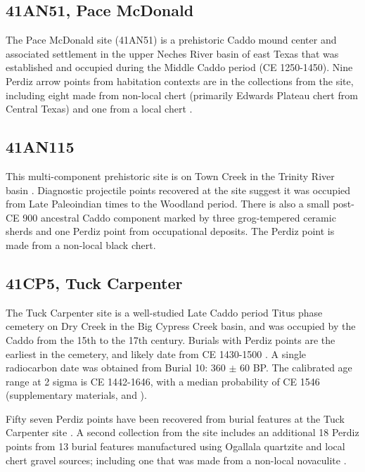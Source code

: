 \documentclass[review]{elsarticle}
\begin{document}
\subsection*{41AN51, Pace McDonald}

The Pace McDonald site (41AN51) is a prehistoric Caddo mound center and associated settlement in the upper Neches River basin of east Texas that was established and occupied during the Middle Caddo period (CE 1250-1450). Nine Perdiz arrow points from habitation contexts are in the collections from the site, including eight made from non-local chert (primarily Edwards Plateau chert from Central Texas) and one from a local chert \citep{RN2444}.

\subsection*{41AN115}

This multi-component prehistoric site is on Town Creek in the Trinity River basin \citep{RN8982}. Diagnostic projectile points recovered at the site suggest it was occupied from Late Paleoindian times to the Woodland period. There is also a small post-CE 900 ancestral Caddo component marked by three grog-tempered ceramic sherds and one Perdiz point from occupational deposits. The Perdiz point is made from a non-local black chert.

\subsection*{41CP5, Tuck Carpenter}

The Tuck Carpenter site is a well-studied Late Caddo period Titus phase cemetery on Dry Creek in the Big Cypress Creek basin, and was occupied by the Caddo from the 15th to the 17th century. Burials with Perdiz points are the earliest in the cemetery, and likely date from CE 1430-1500 \citep[197]{RN8962}. A single radiocarbon date was obtained from Burial 10: 360 $\pm$ 60 BP. The calibrated age range at 2 sigma is CE 1442-1646, with a median probability of CE 1546 (supplementary materials, and \citet{RN8980}).

Fifty seven Perdiz points have been recovered from burial features at the Tuck Carpenter site \citep{RN8963,RN3158,RN3159}. A second collection from the site includes an additional 18 Perdiz points from 13 burial features manufactured using Ogallala quartzite and local chert gravel sources; including one that was made from a non-local novaculite \citep[Table 2]{RN8962}.
\end{document}
